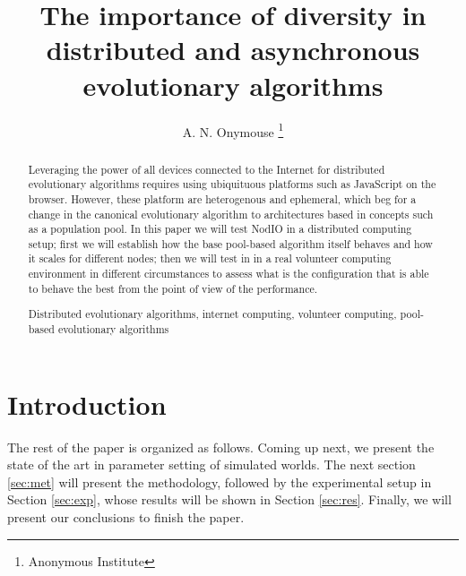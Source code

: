 \documentclass[runningheads,a4paper]{llncs}
\newcommand{\keywords}[1]{\par\addvspace\baselineskip
\noindent\keywordname\enspace\ignorespaces#1}
\begin{document}
\mainmatter  

\title{The importance of diversity in distributed and asynchronous
  evolutionary algorithms}  


\author{A. N. Onymouse%
\thanks{Anonymous Institute}}
%




\maketitle

\begin{abstract}

Leveraging the power of all devices connected to the Internet for
distributed evolutionary algorithms requires using ubiquituous
platforms such as JavaScript on the browser. However, these platform
are heterogenous and ephemeral, which beg for a change in the canonical
evolutionary algorithm to architectures based in concepts such as a
population pool. In this paper we will test NodIO in a distributed
computing setup; first we will establish how the base pool-based algorithm itself
behaves and how it scales for different nodes; then we will test in in
a real volunteer computing environment in different circumstances to
assess what is the configuration that is able to behave the best from
the point of view of the performance. 

\keywords{Distributed evolutionary algorithms, internet computing,
  volunteer computing, pool-based evolutionary algorithms}
\end{abstract}

\section{Introduction}

The rest of the paper is organized as follows. Coming up next, we
present the state of the art in parameter setting of simulated
worlds. The next section \ref{sec:met} will present the methodology,
followed by the experimental setup in Section \ref{sec:exp}, whose results will be shown in Section \ref{sec:res}. Finally, we will
present our conclusions to finish the paper.
\end{document}
